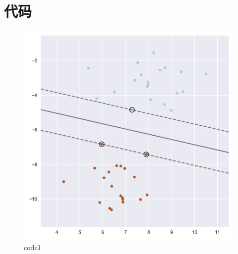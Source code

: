 \section{代码}

\begin{PythonCode}\label{例1}
	
\end{PythonCode}

\begin{figure}[htbp]
	\centering
	\includegraphics[width=14cm]{codeimage/code1}
	\caption{code1}
	\label{code1}
\end{figure}

\begin{PythonCode}\label{例2}
	
\end{PythonCode}

